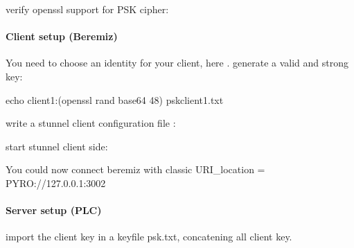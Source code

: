 \documentclass[letterpaper,10pt,english]{sphinxmanual}
\begin{document}
verify openssl support for PSK cipher:

%
\begin{sphinxVerbatim}[commandchars=\\\{\}]
   
\end{sphinxVerbatim}


\paragraph{Client setup (Beremiz)}
\label{\detokenize{manual/connectors:client-setup-beremiz}}
You need to choose an identity for your client, here .
generate a valid and strong key:

%
\begin{sphinxVerbatim}[commandchars=\\\{\}]
\PYGZdl{} echo client1:\PYGZdl{}(openssl rand \PYGZhy{}base64 48) \PYGZgt{} pskclient1.txt
\end{sphinxVerbatim}

write a stunnel client configuration file :

%
\begin{sphinxVerbatim}[commandchars=\\\{\}]
  
  

\PYG{p}{[}\PYG{p}{]}
  
  \PYG{p}{[}\PYG{p}{]}
  
  
\end{sphinxVerbatim}

start stunnel client side:

%
\begin{sphinxVerbatim}[commandchars=\\\{\}]
 
\end{sphinxVerbatim}

You could now connect beremiz with classic URI\_location = PYRO://127.0.0.1:3002


\paragraph{Server setup (PLC)}
\label{\detokenize{manual/connectors:server-setup-plc}}
import the client key in a keyfile psk.txt, concatening all client key.
\end{document}
